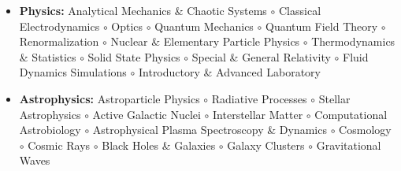 \documentclass[11pt,a4paper]{article}
\begin{document}
\vspace{7pt}

\begin{itemize}[itemsep=-2pt, topsep=0pt, leftmargin=0pt, label={}]
	\item \textbf{Physics:} Analytical Mechanics \& Chaotic Systems $\circ$ Classical Electrodynamics $\circ$ Optics $\circ$
	Quantum Mechanics $\circ$ Quantum Field Theory $\circ$ Renormalization $\circ$ Nuclear \& Elementary
	Particle Physics $\circ$ Thermodynamics \& Statistics $\circ$ Solid State Physics $\circ$ Special \& General
	Relativity $\circ$ Fluid Dynamics Simulations $\circ$ Introductory \& Advanced Laboratory
\end{itemize}

\vspace{7pt}

\begin{itemize}[itemsep=-2pt, topsep=0pt, leftmargin=0pt, label={}]
	\item \textbf{Astrophysics:} Astroparticle Physics $\circ$ Radiative Processes $\circ$ Stellar Astrophysics $\circ$ Active
	Galactic Nuclei $\circ$ Interstellar Matter $\circ$ Computational Astrobiology $\circ$ Astrophysical Plasma
	Spectroscopy \& Dynamics $\circ$ Cosmology $\circ$ Cosmic Rays $\circ$ Black Holes \& Galaxies $\circ$ Galaxy Clusters $\circ$
	Gravitational Waves
\end{itemize}

\end{document}
